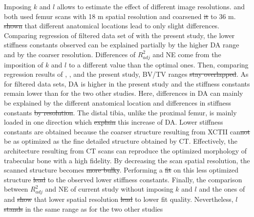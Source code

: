\documentclass[a4paper,fleqn]{DC_ArtStyle}
\providecommand{\DIFadd}[1]{{\protect\color{blue}{#1}}} %
\providecommand{\DIFdel}[1]{{\protect\color{red}\sout{#1}}}                      %
\providecommand{\DIFaddbegin}{} %
\providecommand{\DIFaddend}{} %
\providecommand{\DIFdelbegin}{} %
\providecommand{\DIFdelend}{} %
\begin{document}
Imposing $k$ and $l$ allows \DIFaddbegin \DIFadd{one }\DIFaddend to estimate the effect of different image resolutions.  \citeauthor{Panyasantisuk2015}\cite{Panyasantisuk2015} and \citeauthor{Gross2013}\cite{Gross2013} both used femur scans with 18 \si{\micro}m spatial resolution and coarsened \DIFdelbegin \DIFdel{it }\DIFdelend \DIFaddbegin \DIFadd{them }\DIFaddend to 36 \si{\micro}m. \citeauthor{Gross2013}\cite{Gross2013} \DIFdelbegin \DIFdel{shown }\DIFdelend \DIFaddbegin \DIFadd{showed }\DIFaddend that different anatomical locations lead to only slight differences. Comparing regression of \DIFaddbegin \DIFadd{the }\DIFaddend filtered data set of \citeauthor{Panyasantisuk2015}\cite{Panyasantisuk2015} with the present study, the lower stiffness constants observed can be explained partially by the higher DA range and by the coarser resolution. Differences of $R^2_{adj}$ and NE come from the imposition of $k$ and $l$ to a different value than the optimal ones. Then, comparing regression results of \citeauthor{Panyasantisuk2015}\cite{Panyasantisuk2015}, \citeauthor{Gross2013}\cite{Gross2013}, and the present study, BV/TV ranges \DIFdelbegin \DIFdel{stay overlapped}\DIFdelend \DIFaddbegin \DIFadd{overlap}\DIFaddend . As for \DIFaddbegin \DIFadd{the }\DIFaddend filtered data sets, DA is higher in the present study and the stiffness constants remain lower than for the two other studies. Here, differences in DA can mainly be explained by the different anatomical location and differences in stiffness constants \DIFdelbegin \DIFdel{by resolution}\DIFdelend \DIFaddbegin \DIFadd{as a result of the different image resolutions}\DIFaddend . The distal tibia, unlike the proximal femur, is mainly loaded in one direction which \DIFdelbegin \DIFdel{explain }\DIFdelend \DIFaddbegin \DIFadd{explains }\DIFaddend this increase of DA. Lower stiffness constants are obtained because the coarser structure resulting from XCTII can\DIFdelbegin \DIFdel{not }\DIFdelend \DIFaddbegin \DIFadd{'t }\DIFaddend be as optimized as the fine detailed structure obtained by \si{\micro}CT. Effectively, the architecture resulting from \si{\micro}CT scans can reproduce the optimized morphology of trabecular bone with a high fidelity. By decreasing the scan spatial resolution, the scanned structure becomes \DIFdelbegin \DIFdel{more bulky}\DIFdelend \DIFaddbegin \DIFadd{bulkier}\DIFaddend . Performing a \DIFdelbegin \DIFdel{fit }\DIFdelend \DIFaddbegin \DIFadd{linear regression }\DIFaddend on this less optimized structure \DIFdelbegin \DIFdel{lead }\DIFdelend \DIFaddbegin \DIFadd{leads }\DIFaddend to the observed lower stiffness constants. Finally, the comparison between $R^2_{adj}$ and NE of current study without imposing $k$ and $l$ and the ones of \citeauthor{Panyasantisuk2015}\cite{Panyasantisuk2015} and  \citeauthor{Gross2013}\cite{Gross2013} \DIFdelbegin \DIFdel{show }\DIFdelend \DIFaddbegin \DIFadd{shows }\DIFaddend that lower spatial resolution \DIFdelbegin \DIFdel{lead }\DIFdelend \DIFaddbegin \DIFadd{leads }\DIFaddend to lower fit quality. Nevertheless, $l$ \DIFdelbegin \DIFdel{stands }\DIFdelend \DIFaddbegin \DIFadd{stays }\DIFaddend in the same range as for the two other studies \DIFaddbegin \DIFadd{\mbox{%
}}
\end{document}
